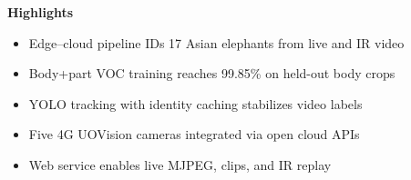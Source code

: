 \documentclass[12pt]{article}
\begin{document}
\noindent\textbf{Highlights}

\begin{itemize}
  \item Edge--cloud pipeline IDs 17 Asian elephants from live and IR video
  \item Body+part VOC training reaches 99.85\% on held-out body crops
  \item YOLO tracking with identity caching stabilizes video labels
  \item Five 4G UOVision cameras integrated via open cloud APIs
  \item Web service enables live MJPEG, clips, and IR replay
\end{itemize}
\end{document}
